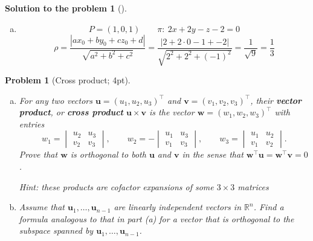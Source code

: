\documentclass[12pt,a4]{article}
\newtheorem{problem}{Problem}
\newtheorem{solution}{Solution to the problem}
\newcommand{\bu}{{\mathbf u}}
\newcommand{\bv}{{\mathbf v}}
\newcommand{\bw}{{\mathbf w}}
\newcommand{\sprod}[2]{\left \langle #1, #2 \right \rangle}
\newcommand{\norm}[1]{\left\lVert#1\right\rVert}
\newcommand{\abs}[1]{\left | #1 \right |}
\newcommand{\vect}[1]{\overrightarrow{#1}}
\begin{document}
\begin{solution}[]
\begin{enumerate}[(a)]
\[\frac{\abs{\sprod{\vect{PQ'}}{n}}}{\norm{n}} =
\frac{\abs{\sprod{\begin{pmatrix} x_q-x_0 \\ y_q-y_0 \\ z_q-z_0\end{pmatrix}}{\begin{pmatrix} a \\ b \\ c\end{pmatrix}}}}{\sqrt{a^2+b^2+c^2}} =
\frac{\abs{- d - a x_0 - b y_0 - c z_0}}{\sqrt{a^2+b^2+c^2}}
\]
So:
\[
\rho = \frac{|ax_0 + by_0 + cz_0 + d|}{\sqrt{a^2 + b^2 + c^2}}.
\] 
\item
\[
P=(1,0,1)
\qquad
\pi: ~2x+2y-z-2=0
\]
\[
\rho = \frac{|ax_0 + by_0 + cz_0 + d|}{\sqrt{a^2 + b^2 + c^2}} = \frac{|2 +2 \cdot 0 -1 + -2|}{\sqrt{2^2 + 2^2 + (-1)^2}} = \frac{1}{\sqrt{9}} = \frac{1}{3}
\] 
\end{enumerate}
\end{solution}


\begin{problem}[Cross product; 4pt]\rm
\begin{enumerate}[(a)]
	\item For any two vectors $\bu  =(u_1,u_2,u_3)^\top$ and $\bv = (v_1,v_2,v_3)^\top$, their \textbf{\emph{vector product}}, or \textbf{\emph{cross product}} $\bu \times \bv$ is the vector $\bw = (w_1,w_2,w_3)^\top$ with entries
	\[
	w_1 = \begin{vmatrix}u_{2}&u_{3}\\v_{2}&v_{3}\end{vmatrix}, \qquad
	w_2 = - \begin{vmatrix}u_{1}&u_{3}\\v_{1}&v_{3}\end{vmatrix},\qquad
	w_3 = \begin{vmatrix}u_{1}&u_{2}\\v_{1}&v_{2}\end{vmatrix}.
	\]
	Prove that $\bw$ is orthogonal to both $\bu$ and $\bv$ in the sense that
	$\bw^\top \bu = \bw^\top \bv = 0$.
	
	{\small{\textsf{Hint: these products are cofactor expansions of some $3\times 3$ matrices}}}
	\item Assume that $\bu_1,\dots, \bu_{n-1}$ are linearly independent vectors in $\mathbb{R}^n$. Find a formula analogous to that in part (a) for a vector that is orthogonal to the subspace spanned by $\bu_1,\dots,\bu_{n-1}$.
	\end{enumerate}
\end{problem}
\end{document}
